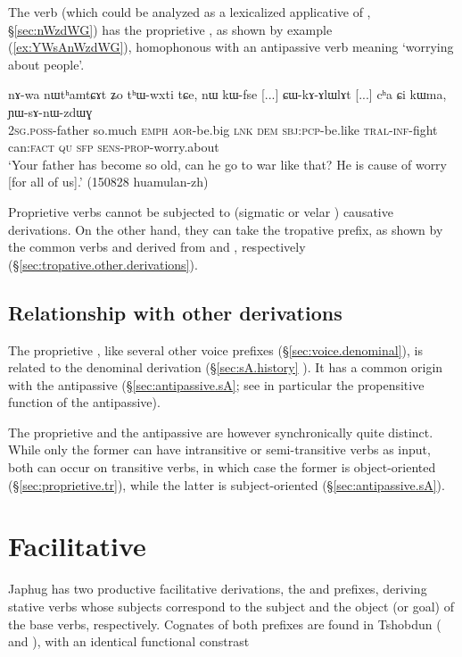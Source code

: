 The verb  (which could be analyzed as a lexicalized applicative of , §\ref{sec:nWzdWG}) has the  proprietive , as shown by example (\ref{ex:YWsAnWzdWG}), homophonous with an antipassive verb meaning `worrying about people'.

\begin{exe}
\ex \label{ex:YWsAnWzdWG}
\gll nɤ-wa nɯtʰamtɕɤt ʑo tʰɯ-wxti tɕe, nɯ kɯ-fse [...] ɕɯ-kɤ-ɤlɯlɤt  [...] cʰa ɕi kɯma, ɲɯ-sɤ-nɯ-zdɯɣ\\
\textsc{2sg}.\textsc{poss}-father so.much \textsc{emph} \textsc{aor}-be.big \textsc{lnk} \textsc{dem} \textsc{sbj}:\textsc{pcp}-be.like { } \textsc{tral}-\textsc{inf}-fight { } can:\textsc{fact} \textsc{qu} \textsc{sfp} \textsc{sens}-\textsc{prop}-worry.about\\
\glt `Your father has become so old, can he go to war like that? He is cause of worry [for all of us].' (150828 huamulan-zh) 
\end{exe}

Proprietive verbs cannot be subjected to (sigmatic  or velar ) causative derivations. On the other hand, they can take the tropative  prefix, as shown by the common verbs  and  derived from  and , respectively (§\ref{sec:tropative.other.derivations}).

\subsection{Relationship with other derivations} 
The proprietive , like several other voice prefixes (§\ref{sec:voice.denominal}), is related to the denominal  derivation (§\ref{sec:sA.history} ). It has a common origin with the antipassive  (§\ref{sec:antipassive.sA}; see in particular the propensitive function of the antipassive). 

The proprietive and the  antipassive are however synchronically quite distinct. While only the former can have intransitive or semi-transitive verbs as input, both can occur on transitive verbs, in which case the former is object-oriented (§\ref{sec:proprietive.tr}), while the latter is subject-oriented (§\ref{sec:antipassive.sA}).


\section{Facilitative} \label{sec:facilitative}
Japhug has two productive facilitative derivations, the  and  prefixes, deriving stative verbs whose subjects correspond to the subject and the object (or goal) of the base verbs, respectively. Cognates of both prefixes are found in Tshobdun ( and ), with an identical functional constrast \citep{jackson14morpho}


